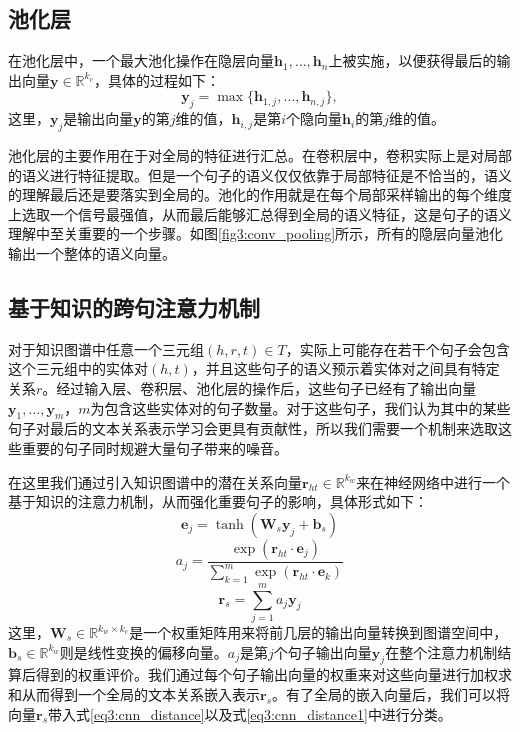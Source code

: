 \subsection{池化层}

在池化层中，一个最大池化操作在隐层向量${\mathbf{h}_1, \ldots , \mathbf{h}_n}$上被实施，以便获得最后的输出向量$\mathbf{y} \in \mathbb{R}^{k_c} $，具体的过程如下：
\begin{equation}
\mathbf{y}_{j} = \max \{\mathbf{h}_{1,j}, \ldots, \mathbf{h}_{n,j} \},
\end{equation}
这里，$\mathbf{y}_{j}$是输出向量$\mathbf{y}$的第$j$维的值，$\mathbf{h}_{i,j}$是第$i$个隐向量$\mathbf{h}_i$的第$j$维的值。

池化层的主要作用在于对全局的特征进行汇总。在卷积层中，卷积实际上是对局部的语义进行特征提取。但是一个句子的语义仅仅依靠于局部特征是不恰当的，语义的理解最后还是要落实到全局的。池化的作用就是在每个局部采样输出的每个维度上选取一个信号最强值，从而最后能够汇总得到全局的语义特征，这是句子的语义理解中至关重要的一个步骤。如图\ref{fig3:conv_pooling}所示，所有的隐层向量池化输出一个整体的语义向量。

\subsection{基于知识的跨句注意力机制}

对于知识图谱中任意一个三元组$(h, r, t) \in T$，实际上可能存在若干个句子会包含这个三元组中的实体对$(h, t)$，并且这些句子的语义预示着实体对之间具有特定关系$r$。经过输入层、卷积层、池化层的操作后，这些句子已经有了输出向量${\mathbf{y}_1, \ldots , \mathbf{y}_m}$，$m$为包含这些实体对的句子数量。对于这些句子，我们认为其中的某些句子对最后的文本关系表示学习会更具有贡献性，所以我们需要一个机制来选取这些重要的句子同时规避大量句子带来的噪音。

在这里我们通过引入知识图谱中的潜在关系向量$\mathbf{r}_{ht} \in \mathbb{R}^{k_w} $来在神经网络中进行一个基于知识的注意力机制，从而强化重要句子的影响，具体形式如下：
\begin{equation}
\mathbf{e}_j  = \tanh(\mathbf{W}_s\mathbf{y}_j+\mathbf{b}_s)
\end{equation}
\begin{equation}
a_j  =\frac{\exp(\mathbf{r}_{ht}\cdot\mathbf{e}_j)}{\sum_{k = 1}^{m} \exp(\mathbf{r}_{ht}\cdot\mathbf{e}_k)}
\end{equation}
\begin{equation}
\mathbf{r}_s  = \sum_{j = 1}^{m} a_j\mathbf{y}_j
\end{equation}
这里，$\mathbf{W}_s \in \mathbb{R}^{k_w \times k_c}$是一个权重矩阵用来将前几层的输出向量转换到图谱空间中，$\mathbf{b}_s \in \mathbb{R}^{k_w}$则是线性变换的偏移向量。$a_j$是第$j$个句子输出向量$\mathbf{y}_j$在整个注意力机制结算后得到的权重评价。我们通过每个句子输出向量的权重来对这些向量进行加权求和从而得到一个全局的文本关系嵌入表示$\mathbf{r}_s$。有了全局的嵌入向量后，我们可以将向量$\mathbf{r}_s$带入式\ref{eq3:cnn_distance}以及式\ref{eq3:cnn_distance1}中进行分类。

